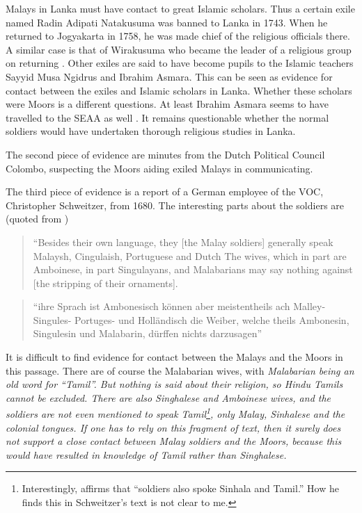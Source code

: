 Malays in Lanka must have contact to great Islamic scholars. Thus
a certain exile named Radin Adipati Natakusuma was banned to Lanka
in 1743. When he returned to Jogyakarta in 1758, he was made chief
of the religious officials there. A similar case is that of
Wirakusuma who became the leader of a religious group on returning
\citep[34]{Hussainmiya1990}. Other exiles are said to have become
pupils to the Islamic teachers Sayyid Musa Ngidrus and Ibrahim
Asmara. This can be seen as evidence for contact between the
exiles and Islamic scholars in Lanka. Whether these scholars were
Moors is a different questions. At least Ibrahim Asmara seems to
have travelled to the SEAA as well \citep{Wijk1893}.  \kuckn It remains
questionable whether the normal soldiers would have undertaken
thorough religious studies in Lanka.

The second piece of evidence are minutes from the Dutch Political Council Colombo, suspecting the Moors aiding exiled Malays in communicating.

The third piece of evidence is a report of a German employee of the \textsc{VOC}, Christopher Schweitzer, from 1680. The interesting parts about the soldiers are (quoted from \citet[45]{Hussainmiya1990})

\begin{quote}
    ``Besides their own language, they [the Malay soldiers] generally speak Malaysh, Cingulaish, Portuguese and Dutch \el The wives, which in part are Amboinese, in part Singulayans, and Malabarians may say nothing against [the stripping of their ornaments].
\end{quote}

\begin{quote}
	``\el ihre Sprach ist Ambonesisch können aber meistentheils ach Malley- Singules- Portuges- und Holländisch \el die Weiber, welche theils Ambonesin, Singulesin und Malabarin, dürffen nichts darzusagen''\citet[106]{Schweitzer}
\end{quote}\kuckn{}


It is difficult to find evidence for contact between the Malays
and the Moors in this passage. There are of course the Malabarian
wives, with \em Malabarian \em being an old word for ``Tamil''.
But nothing is said about their religion, so Hindu Tamils cannot
be excluded. There are also Singhalese and Amboinese wives, and
the soldiers are not even mentioned to speak
Tamil\footnote{Interestingly, \citet[45]{Hussainmiya1990} affirms
that ``soldiers also spoke Sinhala and Tamil.'' How he finds this
in Schweitzer's text is not clear to me.}, only Malay, Sinhalese
and the colonial tongues. If one has to rely on this fragment of
text, then it surely does not support a close contact between
Malay soldiers and the Moors, because this would have resulted in
knowledge of Tamil rather than Singhalese.

